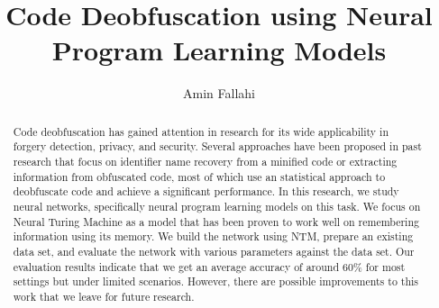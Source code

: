 \documentclass[acmsmall]{acmart}
\begin{document}
\title{Code Deobfuscation using Neural Program Learning Models}

\author{Amin Fallahi}

\renewcommand{\shortauthors}{Fallahi, et al.}

\begin{abstract}
	Code deobfuscation has gained attention in research for its wide applicability in forgery detection, privacy, and security. Several approaches have been proposed in past research that focus on identifier name recovery from a minified code or extracting information from obfuscated code, most of which use an statistical approach to deobfuscate code and achieve a significant performance. In this research, we study neural networks, specifically neural program learning models on this task. We focus on Neural Turing Machine as a model that has been proven to work well on remembering information using its memory. We build the network using NTM, prepare an existing data set, and evaluate the network with various parameters against the data set. Our evaluation results indicate that we get an average accuracy of around 60\% for most settings but under limited scenarios. However, there are possible improvements to this work that we leave for future research.
\end{abstract}
\end{document}
